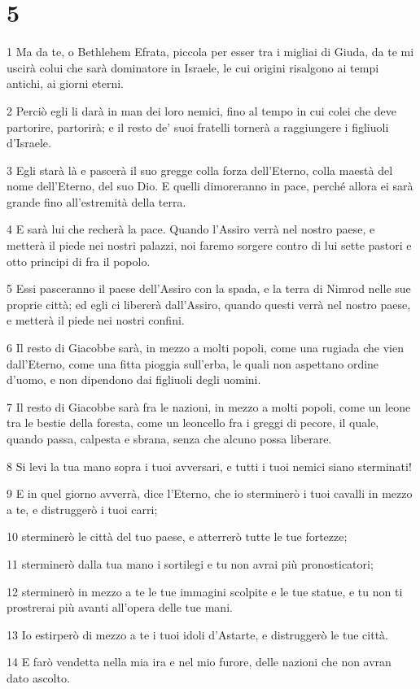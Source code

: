 \chapter{5}

\par 1 Ma da te, o Bethlehem Efrata, piccola per esser tra i migliai di Giuda, da te mi uscirà colui che sarà dominatore in Israele, le cui origini risalgono ai tempi antichi, ai giorni eterni.
\par 2 Perciò egli li darà in man dei loro nemici, fino al tempo in cui colei che deve partorire, partorirà; e il resto de' suoi fratelli tornerà a raggiungere i figliuoli d'Israele.
\par 3 Egli starà là e pascerà il suo gregge colla forza dell'Eterno, colla maestà del nome dell'Eterno, del suo Dio. E quelli dimoreranno in pace, perché allora ei sarà grande fino all'estremità della terra.
\par 4 E sarà lui che recherà la pace. Quando l'Assiro verrà nel nostro paese, e metterà il piede nei nostri palazzi, noi faremo sorgere contro di lui sette pastori e otto principi di fra il popolo.
\par 5 Essi pasceranno il paese dell'Assiro con la spada, e la terra di Nimrod nelle sue proprie città; ed egli ci libererà dall'Assiro, quando questi verrà nel nostro paese, e metterà il piede nei nostri confini.
\par 6 Il resto di Giacobbe sarà, in mezzo a molti popoli, come una rugiada che vien dall'Eterno, come una fitta pioggia sull'erba, le quali non aspettano ordine d'uomo, e non dipendono dai figliuoli degli uomini.
\par 7 Il resto di Giacobbe sarà fra le nazioni, in mezzo a molti popoli, come un leone tra le bestie della foresta, come un leoncello fra i greggi di pecore, il quale, quando passa, calpesta e sbrana, senza che alcuno possa liberare.
\par 8 Si levi la tua mano sopra i tuoi avversari, e tutti i tuoi nemici siano sterminati!
\par 9 E in quel giorno avverrà, dice l'Eterno, che io sterminerò i tuoi cavalli in mezzo a te, e distruggerò i tuoi carri;
\par 10 sterminerò le città del tuo paese, e atterrerò tutte le tue fortezze;
\par 11 sterminerò dalla tua mano i sortilegi e tu non avrai più pronosticatori;
\par 12 sterminerò in mezzo a te le tue immagini scolpite e le tue statue, e tu non ti prostrerai più avanti all'opera delle tue mani.
\par 13 Io estirperò di mezzo a te i tuoi idoli d'Astarte, e distruggerò le tue città.
\par 14 E farò vendetta nella mia ira e nel mio furore, delle nazioni che non avran dato ascolto.

